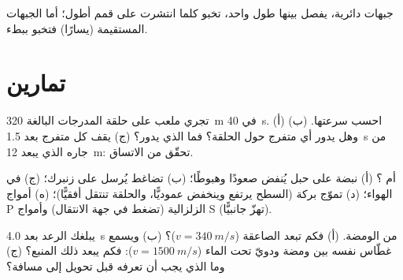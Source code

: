 \begin{omfigure}

{\small جبهات  دائرية، يفصل بينها طول  واحد، تخبو كلما انتشرت
 على قمم أطول؛ أما الجبهات المستقيمة (يسارًا) فتخبو ببطء.}
\end{omfigure}

\section{تمارين}

\begin{exercise}[$\star$]\label{exo:g12:mechanical-waves:1}
تجري  ملعب على حلقة المدرجات البالغة \qty{320}{m} في \qty{40}{s}.
(أ) احسب سرعتها. (ب) وهل يدور أي متفرج حول الحلقة؟
فما الذي يدور؟ (ج) يقف كل متفرج بعد \qty{1.5}{s} من جاره
الذي يبعد \qty{12}{m}: تحقّق من الاتساق.
\end{exercise}

\begin{exercise}[$\star$]\label{exo:g12:mechanical-waves:2}
 أم ؟ (أ) نبضة على حبل يُنفض صعودًا وهبوطًا؛
(ب) تضاغط يُرسل على زنبرك؛ (ج)  في الهواء؛ (د) تموّج
بركة (السطح يرتفع وينخفض عموديًّا، والحلقة تنتقل أفقيًّا)؛ (ه)
أمواج P الزلزالية (تضغط في جهة الانتقال) وأمواج S (تهزّ جانبيًّا).
\end{exercise}

\begin{exercise}[$\star$]\label{exo:g12:mechanical-waves:3}
يبلغك الرعد بعد \qty{4.0}{s} من الومضة. (أ) فكم تبعد
الصاعقة ($v = \qty{340}{m/s}$)؟ (ب) ويسمع غطّاس  نفسه بين
ومضة ودويّ تحت الماء ($v = \qty{1500}{m/s}$): فكم يبعد ذلك
المنبع؟ (ج) وما الذي يجب أن تعرفه قبل تحويل  إلى مسافة؟
\end{exercise}

